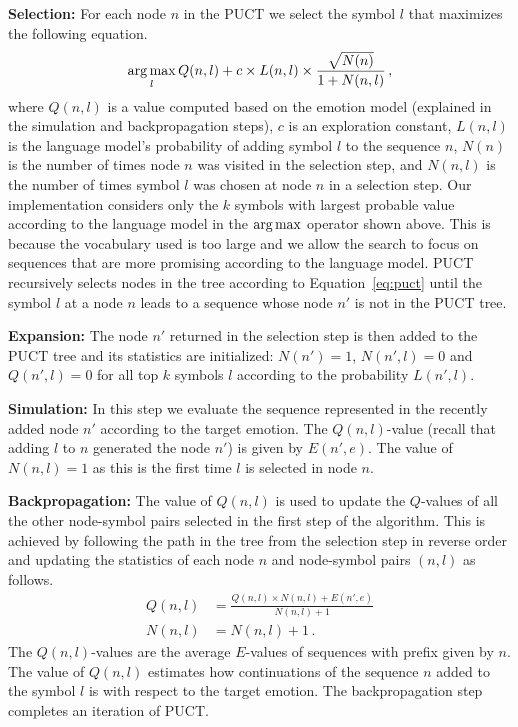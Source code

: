 \vspace{0.1in}
\noindent
\textbf{Selection:} For each node $n$ in the PUCT we select the symbol $l$ that maximizes the following equation.
\begin{equation}
\operatorname*{arg\,max}_{l} Q(n, l) + c \times L(n, l) \times \frac{\sqrt{N(n)}}{1 + N(n, l)} \,,
\label{eq:puct}
\end{equation}
\noindent
where $Q(n, l)$ is a value computed based on the emotion model (explained in the simulation and backpropagation steps), $c$ is an exploration constant, $L(n, l)$ is the language model's probability of adding symbol $l$ to the sequence $n$, $N(n)$ is the number of times node $n$ was visited in the selection step, and $N(n, l)$ is the number of times symbol $l$ was chosen at node $n$ in a selection step. Our implementation considers only the $k$ symbols with largest probable value according to the language model in the $\operatorname*{arg\,max}$ operator shown above. This is because the vocabulary used is too large and we allow the search to focus on sequences that are more promising according to the language model. PUCT recursively selects nodes in the tree according to Equation~\ref{eq:puct} until the symbol $l$ at a node $n$ leads to a sequence whose node $n'$ is not in the PUCT tree.

\vspace{0.1in}
\noindent
\textbf{Expansion:} The node $n'$ returned in the selection step is then added to the PUCT tree and its statistics are initialized: $N(n') = 1$, $N(n', l) = 0$ and $Q(n', l) = 0$ for all top $k$ symbols $l$ according to the probability $L(n', l)$.

\vspace{0.1in}
\noindent
\textbf{Simulation:} In this step we evaluate the sequence represented in the recently added node $n'$ according to the target emotion. The $Q(n, l)$-value (recall that adding $l$ to $n$ generated the node $n'$) is given by $E(n', e)$. The value of $N(n, l) = 1$ as this is the first time $l$ is selected in node $n$.

\vspace{0.1in}
\noindent
\textbf{Backpropagation:} The value of $Q(n, l)$ is used to update the $Q$-values of all the other node-symbol pairs selected in the first step of the algorithm. This is achieved by following the path in the tree from the selection step in reverse order and updating the statistics of each node $n$ and node-symbol pairs $(n, l)$ as follows.
\begin{align*}
Q(n, l) &= \frac{Q(n, l) \times N(n, l) + E(n', e)}{N(n, l) + 1} \\
N(n, l) &= N(n, l) + 1 \,.
\end{align*}
The $Q(n, l)$-values are the average $E$-values of sequences with prefix given by $n$. The value of $Q(n, l)$ estimates how continuations of the sequence $n$ added to the symbol $l$ is with respect to the target emotion. The backpropagation step completes an iteration of PUCT.

